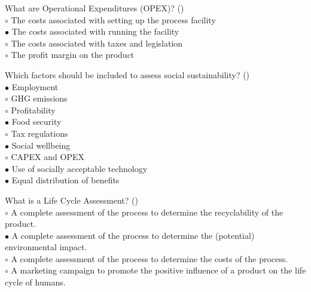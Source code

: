\documentclass[]{beamer}
\begin{document}
\begin{CJK}{UTF8}{gbsn}
\begin{frame}[shrink] {} 
\addtocounter{answers}{1}
\color{blue}
  What are Operational Expenditures (OPEX)?
 ({})\\
\color{black}
\setlength{\parindent}{-0.4cm}
{\color{red}$\circ$} The costs associated with setting up the process facility  \\
{\color{red}$\bullet$} The costs associated with running the facility  \\
{\color{red}$\circ$} The costs associated with taxes and legislation  \\
{\color{red}$\circ$} The profit margin on the product  \\
\end{frame}


\begin{frame}[shrink] {} 
\addtocounter{answers}{1}
\color{blue}
  Which factors should be included to assess social sustainability? 
 ({})\\
\color{black}
\setlength{\parindent}{-0.4cm}
{\color{red}$\bullet$} Employment  \\
{\color{red}$\circ$} GHG emissions  \\
{\color{red}$\circ$} Profitability  \\
{\color{red}$\bullet$} Food security  \\
{\color{red}$\circ$} Tax regulations  \\
{\color{red}$\bullet$} Social wellbeing  \\
{\color{red}$\circ$} CAPEX and OPEX  \\
{\color{red}$\bullet$} Use of socially acceptable technology  \\
{\color{red}$\bullet$} Equal distribution of benefits  \\
\end{frame}


\begin{frame}[shrink] {} 
\addtocounter{answers}{1}
\color{blue}
  What is a Life Cycle Assessment?
 ({})\\
\color{black}
\setlength{\parindent}{-0.4cm}
{\color{red}$\circ$} A complete assessment of the process to determine the recyclability of the product.  \\
{\color{red}$\bullet$} A complete assessment of the process to determine the (potential) environmental impact.  \\
{\color{red}$\circ$} A complete assessment of the process to determine the costs of the process.  \\
{\color{red}$\circ$} A marketing campaign to promote the positive influence of a product on the life cycle of humans.  \\


\end{frame}
\end{CJK}
\end{document}

